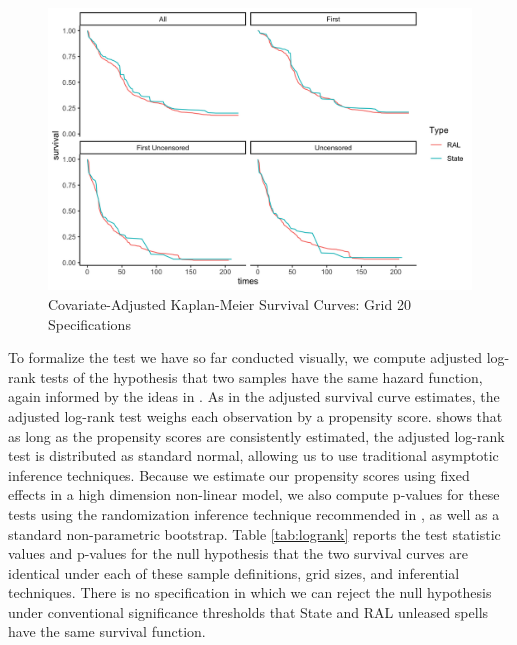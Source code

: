 \begin{appendices}
\begin{figure}[H]
	\centering
	\caption{Covariate-Adjusted Kaplan-Meier Survival Curves: Grid 20 Specifications}\label{fig:km20}
\includegraphics[width=1\textwidth]{../output/figures/ipwkm20.png}
\end{figure}

To formalize the test we have so far conducted visually, we compute adjusted log-rank tests of the hypothesis that two samples have the same hazard function, again informed by the ideas in \cite{xie2005adjusted}.  As in the adjusted survival curve estimates, the adjusted log-rank test weighs each observation by a propensity score.  \cite{xie2005adjusted} shows that as long as the propensity scores are consistently estimated, the adjusted log-rank test is distributed as standard normal, allowing us to use traditional asymptotic inference techniques.  Because we estimate our propensity scores using fixed effects in a high dimension non-linear model, we also compute p-values for these tests using the randomization inference technique recommended in \cite{xie2005adjusted}, as well as a standard non-parametric bootstrap.  Table \ref{tab:logrank} reports the test statistic values and p-values for the null hypothesis that the two survival curves are identical under each of these sample definitions, grid sizes, and inferential techniques.  There is no specification in which we can reject the null hypothesis under conventional significance thresholds that State and RAL unleased spells have the same survival function.  


\end{appendices}
